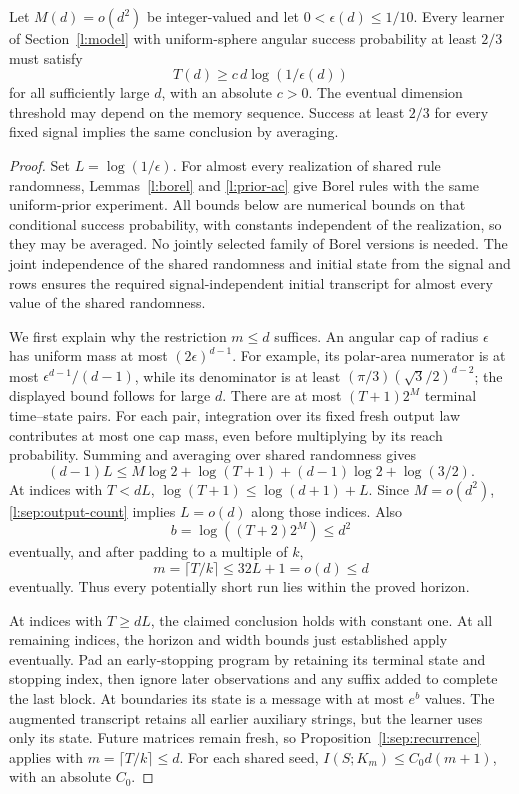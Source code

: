 \begin{theorem}
\label{l:sep:theorem}
Let \(M(d)=o(d^2)\) be integer-valued and let
\(0<\epsilon(d)\le1/10\).  Every learner of
Section~\ref{l:model} with uniform-sphere angular success probability
at least \(2/3\) must satisfy
\[
 T(d)\ge c\,d\log(1/\epsilon(d))
\]
for all sufficiently large \(d\), with an absolute \(c>0\).
The eventual dimension threshold may depend on the memory sequence.
Success at least \(2/3\) for every fixed signal implies the same
conclusion by averaging.
\end{theorem}
\begin{proof}
Set \(L=\log(1/\epsilon)\).  For almost every realization of shared
rule randomness, Lemmas~\ref{l:borel} and \ref{l:prior-ac} give
Borel rules with the same uniform-prior experiment.  All bounds
below are numerical bounds on that conditional success probability,
with constants independent of the realization, so they may be
averaged.  No jointly selected family of Borel versions is needed.
The joint independence of the shared randomness and initial state
from the signal and rows ensures the required signal-independent
initial transcript for almost every value of the shared randomness.

We first explain why the restriction \(m\le d\) suffices.  An
angular cap of radius \(\epsilon\) has uniform mass at most
\((2\epsilon)^{d-1}\).  For example, its polar-area numerator is
at most \(\epsilon^{d-1}/(d-1)\), while its denominator is at least
\((\pi/3)(\sqrt3/2)^{d-2}\); the displayed bound follows for large
\(d\).  There are at most \((T+1)2^M\) terminal time--state pairs.
For each pair, integration over its fixed fresh output law contributes
at most one cap mass, even before multiplying by its reach probability.
Summing and averaging over shared randomness gives
\begin{equation}
 (d-1)L\le M\log2+\log(T+1)+(d-1)\log2+\log(3/2).
 \label{l:sep:output-count}
\end{equation}
At indices with \(T<dL\),
\(\log(T+1)\le\log(d+1)+L\).  Since \(M=o(d^2)\),
\eqref{l:sep:output-count} implies \(L=o(d)\) along those indices.
Also
\[
 b=\log((T+2)2^M)\le d^2
\]
eventually, and after padding to a multiple of \(k\),
\[
 m=\lceil T/k\rceil\le 32L+1=o(d)\le d
\]
eventually.  Thus every potentially short run lies within the
proved horizon.

At indices with \(T\ge dL\), the claimed conclusion holds with
constant one.  At all remaining indices, the horizon and width
bounds just established apply eventually.  Pad an early-stopping
program by retaining its terminal state and stopping index, then
ignore later observations and any suffix added to complete the last
block.  At boundaries its state is a message with at most \(e^b\)
values.  The augmented transcript retains all earlier auxiliary
strings, but the learner uses only its state.  Future matrices remain
fresh, so Proposition~\ref{l:sep:recurrence} applies with
\(m=\lceil T/k\rceil\le d\).  For each shared seed,
\(I(S;K_m)\le C_0d(m+1)\), with an absolute \(C_0\).


\end{proof}
